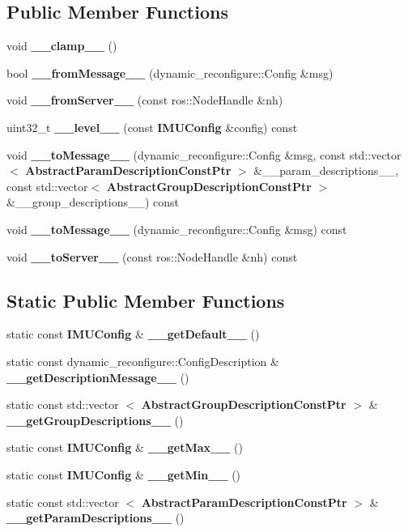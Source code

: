 \subsection*{\-Public \-Member \-Functions}
\begin{DoxyCompactItemize}
\item 
void {\bf \-\_\-\-\_\-clamp\-\_\-\-\_\-} ()
\item 
bool {\bf \-\_\-\-\_\-from\-Message\-\_\-\-\_\-} (dynamic\-\_\-reconfigure\-::\-Config \&msg)
\item 
void {\bf \-\_\-\-\_\-from\-Server\-\_\-\-\_\-} (const ros\-::\-Node\-Handle \&nh)
\item 
uint32\-\_\-t {\bf \-\_\-\-\_\-level\-\_\-\-\_\-} (const {\bf \-I\-M\-U\-Config} \&config) const 
\item 
void {\bf \-\_\-\-\_\-to\-Message\-\_\-\-\_\-} (dynamic\-\_\-reconfigure\-::\-Config \&msg, const std\-::vector$<$ {\bf \-Abstract\-Param\-Description\-Const\-Ptr} $>$ \&\-\_\-\-\_\-param\-\_\-descriptions\-\_\-\-\_\-, const std\-::vector$<$ {\bf \-Abstract\-Group\-Description\-Const\-Ptr} $>$ \&\-\_\-\-\_\-group\-\_\-descriptions\-\_\-\-\_\-) const 
\item 
void {\bf \-\_\-\-\_\-to\-Message\-\_\-\-\_\-} (dynamic\-\_\-reconfigure\-::\-Config \&msg) const 
\item 
void {\bf \-\_\-\-\_\-to\-Server\-\_\-\-\_\-} (const ros\-::\-Node\-Handle \&nh) const 
\end{DoxyCompactItemize}
\subsection*{\-Static \-Public \-Member \-Functions}
\begin{DoxyCompactItemize}
\item 
static const {\bf \-I\-M\-U\-Config} \& {\bf \-\_\-\-\_\-get\-Default\-\_\-\-\_\-} ()
\item 
static const \*
dynamic\-\_\-reconfigure\-::\-Config\-Description \& {\bf \-\_\-\-\_\-get\-Description\-Message\-\_\-\-\_\-} ()
\item 
static const std\-::vector\*
$<$ {\bf \-Abstract\-Group\-Description\-Const\-Ptr} $>$ \& {\bf \-\_\-\-\_\-get\-Group\-Descriptions\-\_\-\-\_\-} ()
\item 
static const {\bf \-I\-M\-U\-Config} \& {\bf \-\_\-\-\_\-get\-Max\-\_\-\-\_\-} ()
\item 
static const {\bf \-I\-M\-U\-Config} \& {\bf \-\_\-\-\_\-get\-Min\-\_\-\-\_\-} ()
\item 
static const std\-::vector\*
$<$ {\bf \-Abstract\-Param\-Description\-Const\-Ptr} $>$ \& {\bf \-\_\-\-\_\-get\-Param\-Descriptions\-\_\-\-\_\-} ()
\end{DoxyCompactItemize}
